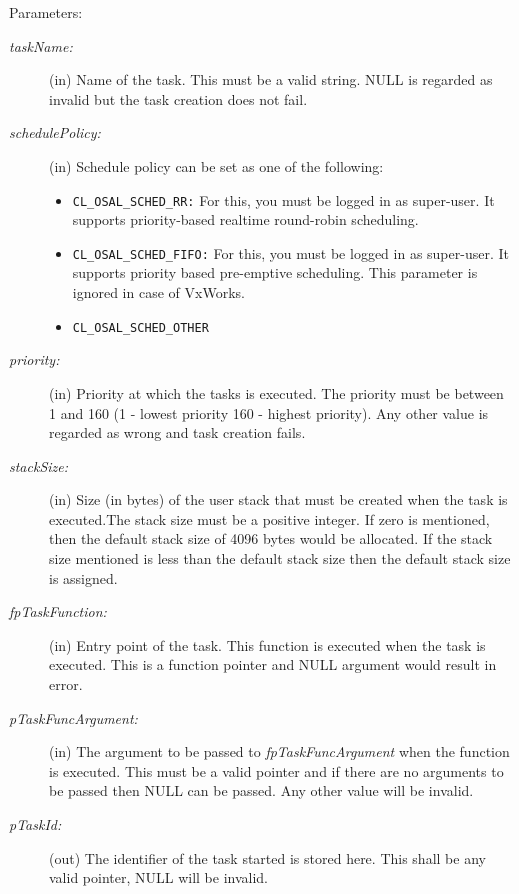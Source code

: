 \begin{Desc}
\item[Parameters:]
\begin{description}
\item[{\em task\-Name:}](in) Name of the task. This must be a valid string. NULL is regarded as invalid but the task creation does not fail.
\item[{\em schedule\-Policy:}](in) Schedule policy can be set as one of the following: \begin{itemize}
\item {\tt CL\_\-OSAL\_\-SCHED\_\-RR:} For this, you must be logged in as super-user. It supports priority-based realtime round-robin scheduling. 
\item {\tt CL\_\-OSAL\_\-SCHED\_\-FIFO:} For this, you must be logged in as super-user. It supports priority based pre-emptive scheduling. This parameter
is ignored in case of Vx\-Works. \item {\tt CL\_\-OSAL\_\-SCHED\_\-OTHER} \end{itemize}
\item[{\em priority:}](in) Priority at which the tasks is executed. The priority must be between 1 and 160 (1 - lowest priority 160 - highest priority). 
Any other value is regarded as wrong and task creation fails.\item[{\em stack\-Size:}](in) Size (in bytes) of the user stack that must be created when the 
task is executed.The stack size must be a positive integer. If zero is mentioned, then the default stack size of 4096 bytes would be allocated. If the
stack size mentioned is less than the default stack size then the default stack size is assigned.\item[{\em fp\-Task\-Function:}](in) Entry point of the task.
This function is executed when the task is executed. This is a function pointer and NULL argument would result in error.
\item[{\em p\-Task\-Func\-Argument:}](in) The argument to be passed to {\em fp\-Task\-Func\-Argument\/} when the function is executed. This must be a 
valid pointer and if there are no arguments to be passed then NULL can be passed. Any other value will be invalid.\item[{\em p\-Task\-Id:}](out) The identifier of the task started is stored here. This shall be any valid pointer, NULL will be invalid.\end{description}
\end{Desc}
